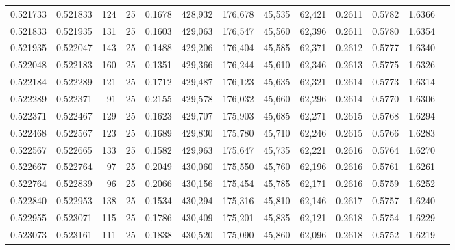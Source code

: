 \begin{tabular}{rrrrrrrrrrrrr}
0.521733 & 0.521833 &   124 &  25 &                                     0.1678 & 428,932 & 176,678 &  45,535 &  62,421 & 0.2611 & 0.5782 & 1.6366 \\
0.521833 & 0.521935 &   131 &  25 &                                     0.1603 & 429,063 & 176,547 &  45,560 &  62,396 & 0.2611 & 0.5780 & 1.6354 \\
0.521935 & 0.522047 &   143 &  25 &                                     0.1488 & 429,206 & 176,404 &  45,585 &  62,371 & 0.2612 & 0.5777 & 1.6340 \\
0.522048 & 0.522183 &   160 &  25 &                                     0.1351 & 429,366 & 176,244 &  45,610 &  62,346 & 0.2613 & 0.5775 & 1.6326 \\
0.522184 & 0.522289 &   121 &  25 &                                     0.1712 & 429,487 & 176,123 &  45,635 &  62,321 & 0.2614 & 0.5773 & 1.6314 \\
0.522289 & 0.522371 &    91 &  25 &                                     0.2155 & 429,578 & 176,032 &  45,660 &  62,296 & 0.2614 & 0.5770 & 1.6306 \\
0.522371 & 0.522467 &   129 &  25 &                                     0.1623 & 429,707 & 175,903 &  45,685 &  62,271 & 0.2615 & 0.5768 & 1.6294 \\
0.522468 & 0.522567 &   123 &  25 &                                     0.1689 & 429,830 & 175,780 &  45,710 &  62,246 & 0.2615 & 0.5766 & 1.6283 \\
0.522567 & 0.522665 &   133 &  25 &                                     0.1582 & 429,963 & 175,647 &  45,735 &  62,221 & 0.2616 & 0.5764 & 1.6270 \\
0.522667 & 0.522764 &    97 &  25 &                                     0.2049 & 430,060 & 175,550 &  45,760 &  62,196 & 0.2616 & 0.5761 & 1.6261 \\
0.522764 & 0.522839 &    96 &  25 &                                     0.2066 & 430,156 & 175,454 &  45,785 &  62,171 & 0.2616 & 0.5759 & 1.6252 \\
0.522840 & 0.522953 &   138 &  25 &                                     0.1534 & 430,294 & 175,316 &  45,810 &  62,146 & 0.2617 & 0.5757 & 1.6240 \\
0.522955 & 0.523071 &   115 &  25 &                                     0.1786 & 430,409 & 175,201 &  45,835 &  62,121 & 0.2618 & 0.5754 & 1.6229 \\
0.523073 & 0.523161 &   111 &  25 &                                     0.1838 & 430,520 & 175,090 &  45,860 &  62,096 & 0.2618 & 0.5752 & 1.6219 \\

\end{tabular}
